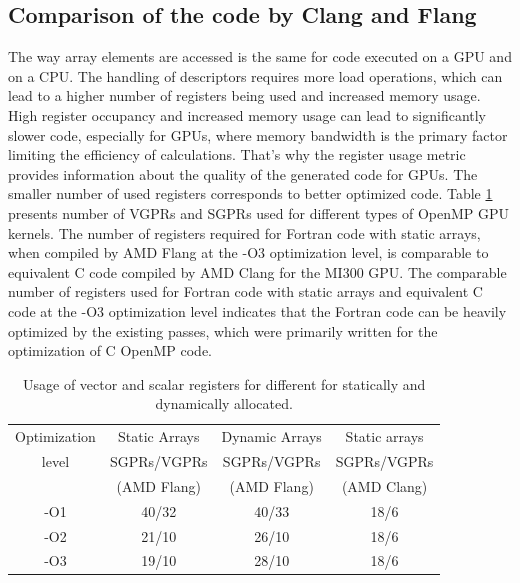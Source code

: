 \documentclass[acmtog,natbib=false]{acmart}
\begin{document}
\subsection{Comparison of the code by Clang and Flang}
The way array elements are accessed is the same for code executed on a GPU and on a CPU.
The handling of descriptors requires more load operations, which can lead to a higher number of registers being used and increased memory usage.
High register occupancy and increased memory usage can lead to significantly slower code, especially for GPUs, where memory bandwidth is the primary factor limiting the efficiency of calculations.
That's why the register usage metric provides information about the quality of the generated code for GPUs.
The smaller number of used registers corresponds to better optimized code.
Table \ref{tab:registerUsage} presents number of VGPRs and SGPRs used for different types of OpenMP GPU kernels.
The number of registers required for Fortran code with static arrays, when compiled by AMD Flang at the -O3 optimization level, is comparable to equivalent C code compiled by AMD Clang for the MI300 GPU.
The comparable number of registers used for Fortran code with static arrays and equivalent C code at the -O3 optimization level indicates that the Fortran code can be heavily optimized by the existing passes, which were primarily written for the optimization of C OpenMP code.

\begin{table}
    \small
    \caption{Usage of vector and scalar registers for different for statically and dynamically allocated.}
    \label{tab:registerUsage}
    \begin{tabular}{|c|c|c|c|}\hline
         Optimization &  Static Arrays &  Dynamic Arrays & Static arrays\\
         level        &  SGPRs/VGPRs    & SGPRs/VGPRs     &SGPRs/VGPRs  \\
                      &  (AMD Flang)   &  (AMD Flang)    & (AMD Clang) \\
        \hline\hline
         -O1&  40/32&  40/33& 18/6\\
         \hline
         -O2&  21/10&  26/10& 18/6\\
         \hline
         -O3&  19/10&  28/10& 18/6\\
         \hline
    \end{tabular}

\end{table}


\end{document}
